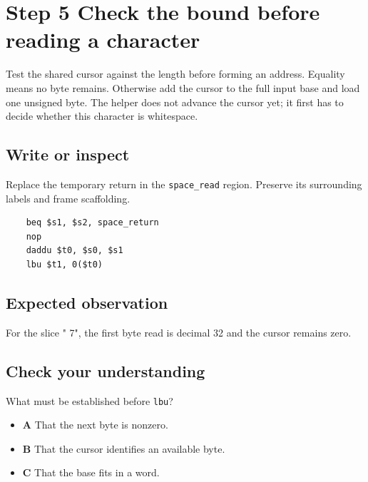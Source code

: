 \section{Step 5 Check the bound before reading a character}\label{expression-s05}

Test the shared cursor against the length before forming an address. Equality means no byte remains. Otherwise add the cursor to the full input base and load one unsigned byte. The helper does not advance the cursor yet; it first has to decide whether this character is whitespace.

\subsection{Write or inspect}
Replace the temporary return in the \texttt{space\_read} region. Preserve its surrounding labels and frame scaffolding.

\begin{verbatim}
    beq $s1, $s2, space_return
    nop
    daddu $t0, $s0, $s1
    lbu $t1, 0($t0)
\end{verbatim}
\subsection{Expected observation}
For the slice " 7", the first byte read is decimal 32 and the cursor remains zero.

\subsection{Check your understanding}
What must be established before \texttt{lbu}?

\begin{itemize}
  \item \textbf{A} That the next byte is nonzero.
  \item \textbf{B} That the cursor identifies an available byte.
  \item \textbf{C} That the base fits in a word.
\end{itemize}
